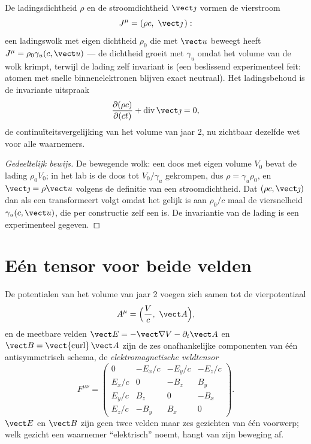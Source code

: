 \begin{proposition}\label{prop:b3:covariant-electromagnetism:fourcurrent}
De ladingsdichtheid $\rho$ en de stroomdichtheid $\vect\jmath$ vormen de
vierstroom
\[
J^\mu = (\rho c,\ \vect\jmath\,) :
\]
een ladingswolk met eigen dichtheid $\rho_0$ die met $\vect u$ beweegt
heeft $J^\mu = \rho_0\gamma_u(c, \vect u)$ --- de dichtheid groeit met
$\gamma_u$ omdat het volume van de wolk krimpt, terwijl de lading zelf
invariant is (een beslissend experimenteel feit: atomen met snelle
binnenelektronen blijven exact neutraal). Het ladingsbehoud is de
invariante uitspraak
\[
\frac{\partial(\rho c)}{\partial(ct)} +
\operatorname{div}\vect\jmath = 0 ,
\]
de continuïteitsvergelijking van het volume van jaar 2, nu zichtbaar
dezelfde wet voor alle waarnemers.
\end{proposition}

\begin{proof}[Gedeeltelijk bewijs]
De bewegende wolk: een doos met eigen volume $V_0$ bevat de lading
$\rho_0
V_0$; in het lab is de doos tot $V_0/\gamma_u$ gekrompen, dus
$\rho =
\gamma_u\rho_0$, en $\vect\jmath = \rho\vect u$ volgens de
definitie van een stroomdichtheid. Dat $(\rho c, \vect\jmath)$ dan als
een  transformeert volgt omdat het gelijk is aan $\rho_0/c$
maal de viersnelheid $\gamma_u(c, \vect u)$, die per constructie zelf een
 is. De invariantie van de lading is een experimenteel gegeven.
\end{proof}

\section{Eén tensor voor beide velden}

\begin{definition}\label{def:b3:covariant-electromagnetism:tensor}
De potentialen van het volume van jaar 2 voegen zich samen tot de
vierpotentiaal
\[
A^\mu = \Big(\frac{V}{c},\ \vect A\Big) ,
\]
en de meetbare velden $\vect E = -\vect\nabla V -
\partial_t\vect A$ en
$\vect B = \operatorname{\vect{curl}}\vect A$ zijn de zes onafhankelijke
componenten van één antisymmetrisch schema, de
\emph{elektromagnetische veldtensor}
\[
F^{\mu\nu} =
\begin{pmatrix}
0 & -E_x/c & -E_y/c & -E_z/c\\
E_x/c & 0 & -B_z & B_y\\
E_y/c & B_z & 0 & -B_x\\
E_z/c & -B_y & B_x & 0
\end{pmatrix} .
\]
$\vect E$ en $\vect B$ zijn geen twee velden maar zes gezichten van één
voorwerp; welk gezicht een waarnemer ``elektrisch'' noemt, hangt van zijn
beweging af.
\end{definition}

